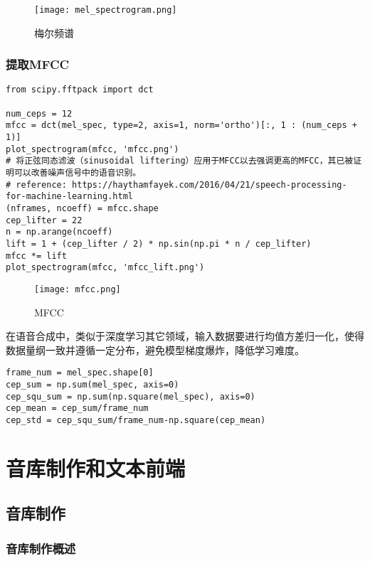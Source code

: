 \documentclass[cn,10pt,math=newtx,citestyle=gb7714-2015,bibstyle=gb7714-2015]{elegantbook}
\begin{document}
\begin{figure}[htbp]
  \centering
  \texttt{[image: mel\_spectrogram.png]}
  \caption{梅尔频谱 \label{fig:mel_spectrogram}}
\end{figure}

\subsection{提取MFCC}

\begin{lstlisting}
from scipy.fftpack import dct

num_ceps = 12
mfcc = dct(mel_spec, type=2, axis=1, norm='ortho')[:, 1 : (num_ceps + 1)]
plot_spectrogram(mfcc, 'mfcc.png')
# 将正弦同态滤波（sinusoidal liftering）应用于MFCC以去强调更高的MFCC，其已被证明可以改善噪声信号中的语音识别。
# reference: https://haythamfayek.com/2016/04/21/speech-processing-for-machine-learning.html
(nframes, ncoeff) = mfcc.shape
cep_lifter = 22
n = np.arange(ncoeff)
lift = 1 + (cep_lifter / 2) * np.sin(np.pi * n / cep_lifter)
mfcc *= lift
plot_spectrogram(mfcc, 'mfcc_lift.png')
\end{lstlisting}

\begin{figure}[htbp]
  \centering
  \texttt{[image: mfcc.png]}
  \caption{MFCC \label{fig:mfcc}}
\end{figure}

在语音合成中，类似于深度学习其它领域，输入数据要进行均值方差归一化，使得数据量纲一致并遵循一定分布，避免模型梯度爆炸，降低学习难度。

\begin{lstlisting}
frame_num = mel_spec.shape[0]
cep_sum = np.sum(mel_spec, axis=0)
cep_squ_sum = np.sum(np.square(mel_spec), axis=0)
cep_mean = cep_sum/frame_num
cep_std = cep_squ_sum/frame_num-np.square(cep_mean)
\end{lstlisting}


\chapter{音库制作和文本前端}

\section{音库制作}

\subsection{音库制作概述}
\end{document}

